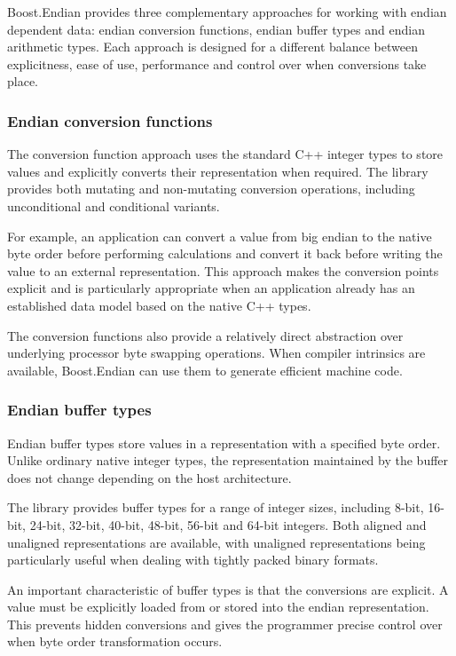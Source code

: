 Boost.Endian provides three complementary approaches for working with endian dependent data: endian conversion functions,
endian buffer types and endian arithmetic types. Each approach is designed for a different balance between explicitness, 
ease of use, performance and control over when conversions take place.

\subsubsection{Endian conversion functions}

The conversion function approach uses the standard C++ integer types to store values and explicitly converts their representation 
when required. The library provides both mutating and non-mutating conversion operations, including unconditional and conditional variants.

For example, an application can convert a value from big endian to the native byte order before performing calculations and convert
it back before writing the value to an external representation. This approach makes the conversion points explicit and is 
particularly appropriate when an application already has an established data model based on the native C++ types.

The conversion functions also provide a relatively direct abstraction over underlying processor byte swapping operations. When compiler
intrinsics are available, Boost.Endian can use them to generate efficient machine code.

\subsubsection{Endian buffer types}

Endian buffer types store values in a representation with a specified byte order. Unlike ordinary native integer types,
the representation maintained by the buffer does not change depending on the host architecture.

The library provides buffer types for a range of integer sizes, including 8-bit, 16-bit, 24-bit, 32-bit, 40-bit, 48-bit, 56-bit
and 64-bit integers. Both aligned and unaligned representations are available, with unaligned representations being particularly
useful when dealing with tightly packed binary formats.

An important characteristic of buffer types is that the conversions are explicit. A value must be explicitly loaded from or stored
into the endian representation. This prevents hidden conversions and gives the programmer precise control over when byte order 
transformation occurs.

